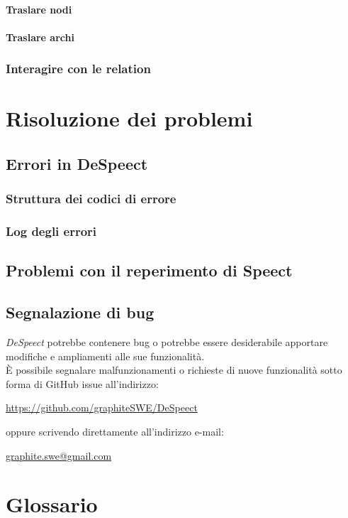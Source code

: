 \documentclass[openany,12pt,a4paper]{report}
\begin{document}
	\subsubsection{Traslare nodi}
	
	\subsubsection{Traslare archi}
	
	\subsection{Interagire con le relation}
	
	\chapter{Risoluzione dei problemi}
	
	\section{Errori in DeSpeect}
	
	\subsection{Struttura dei codici di errore}
	
	\subsection{Log degli errori}
	
	\section{Problemi con il reperimento di Speect}
	
	\section{Segnalazione di bug}
	
	\textit{DeSpeect} potrebbe contenere bug o potrebbe essere desiderabile apportare modifiche e ampliamenti alle sue funzionalità. \\ È possibile segnalare malfunzionamenti o richieste di nuove funzionalità sotto forma di GitHub issue all’indirizzo:
	\begin{center}
		\url{https://github.com/graphiteSWE/DeSpeect}
	\end{center}
  oppure scrivendo direttamente all'indirizzo e-mail:
  \begin{center}
  	\url{graphite.swe@gmail.com}
  \end{center}
	
	\appendix
	
	\chapter{Glossario}
	
\end{document}
